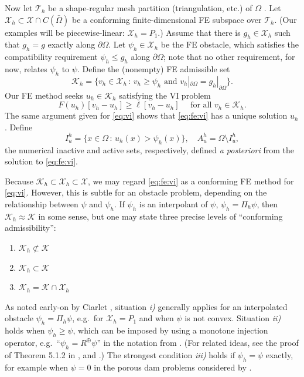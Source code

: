 \documentclass[]{interact}
\theoremstyle{plain}%
\theoremstyle{definition}
\theoremstyle{remark}
\newcommand{\cK}{\mathcal{K}}
\newcommand{\cT}{\mathcal{T}}
\newcommand{\cX}{\mathcal{X}}
\begin{document}
Now let $\cT_h$ be a shape-regular mesh partition (triangulation, etc.) of $\Omega$ \cite{AinsworthOden2000,ElmanSilvesterWathen2014}.  Let $\cX_h \subset \cX \cap C(\bar\Omega)$ be a conforming finite-dimensional FE subspace over $\cT_h$.  (Our examples will be piecewise-linear: $\cX_h=P_1$.)  Assume that there is $g_h\in\cX_h$ such that $g_h=g$ exactly along $\partial \Omega$.  Let $\psi_h \in \cX_h$ be the FE obstacle, which satisfies the compatibility requirement $\psi_h \le g_h$ along $\partial\Omega$; note that no other requirement, for now, relates $\psi_h$ to $\psi$.  Define the (nonempty) FE admissible set
\begin{equation} \label{eq:fe:admissible}
\cK_h = \{v_h \in \cX_h \,:\, v_h \ge \psi_h \text{ and } v_h|_{\partial \Omega} = g_h|_{\partial\Omega}\}.
\end{equation}
Our FE method seeks $u_h\in\cK_h$ satisfying the VI problem
\begin{equation} \label{eq:fe:vi}
F(u_h)[v_h - u_h] \ge \ell[v_h - u_h] \quad \text{ for all } v_h \in \cK_h.
\end{equation}
The same argument given for \eqref{eq:vi} shows that \eqref{eq:fe:vi} has a unique solution $u_h$.  Define
\begin{equation}
  I_u^h = \{x \in \Omega \,:\, u_h(x) > \psi_h(x)\}, \quad A_u^h = \Omega \setminus I_u^h, \label{eq:fe:sets}
\end{equation}
the numerical inactive and active sets, respectively, defined \emph{a posteriori} from the solution to \eqref{eq:fe:vi}.

Because $\cK_h \subset \cX_h \subset \cX$, we may regard \eqref{eq:fe:vi} as a conforming FE method for \eqref{eq:vi}.  However, this is subtle for an obstacle problem, depending on the relationship between $\psi$ and $\psi_h$.  If $\psi_h$ is an interpolant of $\psi$, $\psi_h = \Pi_h \psi$, then $\cK_h \approx \cK$ in some sense, but one may state three precise levels of ``conforming admissibility'':
\renewcommand{\labelenumi}{\emph{\roman{enumi})}}
\begin{enumerate}
\item $\cK_h \not \subset \cK$
\item $\cK_h \subset \cK$
\item $\cK_h = \cK \cap \cX_h$
\end{enumerate}
As noted early-on by Ciarlet \cite[Figure 5.1.3]{Ciarlet2002}, situation \emph{i)} generally applies for an interpolated obstacle $\psi_h = \Pi_h \psi$, e.g.~for $\cX_h=P_1$ and when $\psi$ is not convex.  Situation \emph{ii)} holds when $\psi_h \ge \psi$, which can be imposed by using a monotone injection operator, e.g.~``$\psi_h = R^\oplus \psi$'' in the notation from \cite{BuelerFarrell2024}.  (For related ideas, see the proof of Theorem 5.1.2 in \cite{Ciarlet2002}, and \cite{GraeserKornhuber2009}.)  The strongest condition \emph{iii)} holds if $\psi_h=\psi$ exactly, for example when $\psi=0$ in the porous dam problems considered by \cite{AinsworthOdenLee1993}.
\end{document}
